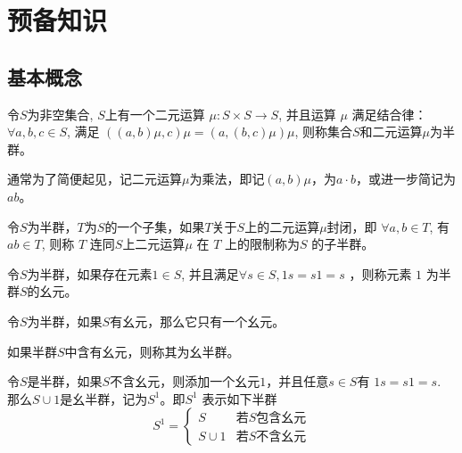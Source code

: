 \chapter{预备知识}

\section{基本概念}

\begin{definition}
    令$S$为非空集合, $S$上有一个二元运算 $\mu:S\times S \to S$, 并且运算 $\mu$ 满足结合律：$\forall a,b,c \in S$, 满足 $((a,b)\mu, c)\mu = (a, (b, c)\mu)\mu$, 则称集合$S$和二元运算$\mu$为半群。
\end{definition}

通常为了简便起见，记二元运算$\mu$为乘法，即记$(a,b)\mu$，为$a\cdot b$，或进一步简记为$ab$。

\begin{definition}
    令$S$为半群，$T$为$S$的一个子集，如果$T$关于$S$上的二元运算$\mu$封闭，即 $\forall a,b \in T$, 有$ab\in T$, 则称 $T$ 连同$S$上二元运算$\mu$ 在 $T$ 上的限制称为$S$ 的子半群。
\end{definition}

\begin{definition}
    令$S$为半群，如果存在元素$1 \in S$, 并且满足$\forall s\in S, 1s=s1=s$ ，则称元素 $1$ 为半群$S$的幺元。
\end{definition}

\begin{lemma}
    令$S$为半群，如果$S$有幺元，那么它只有一个幺元。
\end{lemma}

\begin{definition}
    如果半群$S$中含有幺元，则称其为幺半群。
\end{definition}

\begin{definition}
    令$S$是半群，如果$S$不含幺元，则添加一个幺元$1$，并且任意$s\in S$有 $1s = s1 = s$. 那么$S\cup{1}$是幺半群，记为$S^1$。即$S^1$ 表示如下半群
    \begin{equation*}
        S^1=\begin{cases}
            S & \text{若}S \text{包含幺元} \\
            S \cup {1} & \text{若}S \text{不含幺元}
        \end{cases}
    \end{equation*}
\end{definition}

